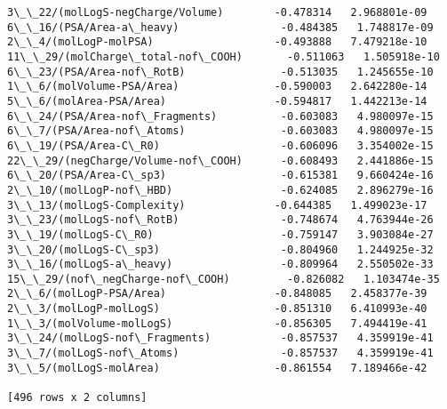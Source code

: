 \documentclass[11pt]{article}
\begin{document}
\begin{Verbatim}[commandchars=\\\{\}]
3\_\_22/(molLogS-negCharge/Volume)        -0.478314   2.968801e-09
6\_\_16/(PSA/Area-a\_heavy)                -0.484385   1.748817e-09
2\_\_4/(molLogP-molPSA)                   -0.493888   7.479218e-10
11\_\_29/(molCharge\_total-nof\_COOH)       -0.511063   1.505918e-10
6\_\_23/(PSA/Area-nof\_RotB)               -0.513035   1.245655e-10
1\_\_6/(molVolume-PSA/Area)               -0.590003   2.642280e-14
5\_\_6/(molArea-PSA/Area)                 -0.594817   1.442213e-14
6\_\_24/(PSA/Area-nof\_Fragments)          -0.603083   4.980097e-15
6\_\_7/(PSA/Area-nof\_Atoms)               -0.603083   4.980097e-15
6\_\_19/(PSA/Area-C\_R0)                   -0.606096   3.354002e-15
22\_\_29/(negCharge/Volume-nof\_COOH)      -0.608493   2.441886e-15
6\_\_20/(PSA/Area-C\_sp3)                  -0.615381   9.660424e-16
2\_\_10/(molLogP-nof\_HBD)                 -0.624085   2.896279e-16
3\_\_13/(molLogS-Complexity)              -0.644385   1.499023e-17
3\_\_23/(molLogS-nof\_RotB)                -0.748674   4.763944e-26
3\_\_19/(molLogS-C\_R0)                    -0.759147   3.903084e-27
3\_\_20/(molLogS-C\_sp3)                   -0.804960   1.244925e-32
3\_\_16/(molLogS-a\_heavy)                 -0.809964   2.550502e-33
15\_\_29/(nof\_negCharge-nof\_COOH)         -0.826082   1.103474e-35
2\_\_6/(molLogP-PSA/Area)                 -0.848085   2.458377e-39
2\_\_3/(molLogP-molLogS)                  -0.851310   6.410993e-40
1\_\_3/(molVolume-molLogS)                -0.856305   7.494419e-41
3\_\_24/(molLogS-nof\_Fragments)           -0.857537   4.359919e-41
3\_\_7/(molLogS-nof\_Atoms)                -0.857537   4.359919e-41
3\_\_5/(molLogS-molArea)                  -0.861554   7.189466e-42

[496 rows x 2 columns]

    \end{Verbatim}
\end{document}
